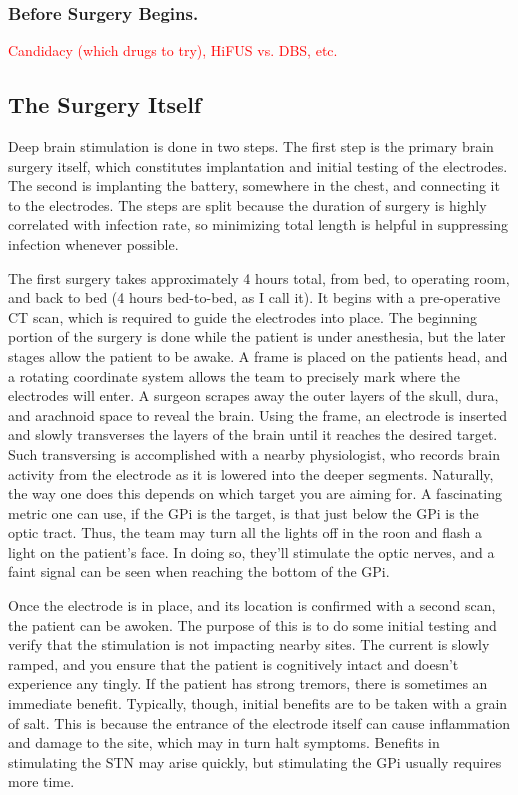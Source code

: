 \subsubsection{Before Surgery Begins.}

\textcolor{red}{Candidacy (which drugs to try), HiFUS vs. DBS, etc. }


\subsection{The Surgery Itself}

Deep brain stimulation is done in two steps. The first step is the primary brain surgery itself, which constitutes implantation and initial testing of the electrodes. The second is implanting the battery, somewhere in the chest, and connecting it to the electrodes. The steps are split because the duration of surgery is highly correlated with infection rate, so minimizing total length is helpful in suppressing infection whenever possible.\newline

The first surgery takes approximately 4 hours total, from bed, to operating room, and back to bed (4 hours bed-to-bed, as I call it). It begins with a pre-operative CT scan, which is required to guide the electrodes into place. The beginning portion of the surgery is done while the patient is under anesthesia, but the later stages allow the patient to be awake. A frame is placed on the patients head, and a rotating coordinate system allows the team to precisely mark where the electrodes will enter. A surgeon scrapes away the outer layers of the skull, dura, and arachnoid space to reveal the brain. Using the frame, an electrode is inserted and slowly transverses the layers of the brain until it reaches the desired target. Such transversing is accomplished with a nearby physiologist, who records brain activity from the electrode as it is lowered into the deeper segments. Naturally, the way one does this depends on which target you are aiming for. A fascinating metric one can use, if the GPi is the target, is that just below the GPi is the optic tract. Thus, the team may turn all the lights off in the roon and flash a light on the patient's face. In doing so, they'll stimulate the optic nerves, and a faint signal can be seen when reaching the bottom of the GPi.\newline

Once the electrode is in place, and its location is confirmed with a second scan, the patient can be awoken. The purpose of this is to do some initial testing and verify that the stimulation is not impacting nearby sites. The current is slowly ramped, and you ensure that the patient is cognitively intact and doesn't experience any tingly. If the patient has strong tremors, there is sometimes an immediate benefit. Typically, though, initial benefits are to be taken with a grain of salt. This is because the entrance of the electrode itself can cause inflammation and damage to the site, which may in turn halt symptoms. Benefits in stimulating the STN may arise quickly, but stimulating the GPi usually requires more time. 


